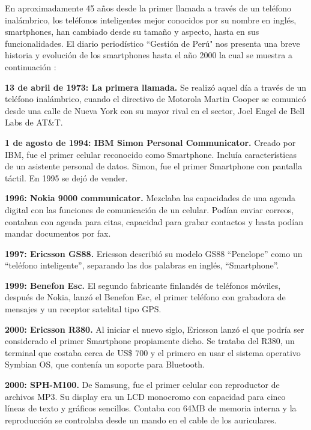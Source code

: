 
En aproximadamente 45 años desde la primer llamada a través de un teléfono inalámbrico, los teléfonos inteligentes mejor conocidos por su nombre en inglés, smartphones, han cambiado desde su tamaño y aspecto, hasta en sus funcionalidades. El diario periodístico ``Gestión de Perú" nos presenta una breve historia y evolución de los smartphones hasta el año 2000 la cual se muestra a continuación  \cite{MBHistoria}: \\ \par

\textbf{13 de abril de 1973: La primera llamada.}
Se realizó aquel día a través de un teléfono inalámbrico, cuando el directivo de Motorola Martin Cooper se comunicó desde una calle de Nueva York con su mayor rival en el sector, Joel Engel de Bell Labs de AT\&T.
\\ \par
\textbf{1 de agosto de 1994: IBM Simon Personal Communicator.}
Creado por IBM, fue el primer celular reconocido como Smartphone. Incluía características de un asistente personal de datos. Simon, fue el primer Smartphone con pantalla táctil. En 1995 se dejó de vender.
\\ \par
\textbf{1996: Nokia 9000 communicator.}
Mezclaba las capacidades de una agenda digital con las funciones de comunicación de un celular. Podían enviar correos, contaban con agenda para citas, capacidad para grabar contactos y hasta podían mandar documentos por fax.
\\ \par
\textbf{1997: Ericsson GS88.}
Ericsson describió su modelo GS88 “Penelope” como un “teléfono inteligente”, separando las dos palabras en inglés, “Smartphone”.
\\ \par
\textbf{1999: Benefon Esc.}
El segundo fabricante finlandés de teléfonos móviles, después de Nokia, lanzó el Benefon Esc, el primer teléfono con grabadora de mensajes y un receptor satelital tipo GPS.
\\ \par
\textbf{2000: Ericsson R380.}
Al iniciar el nuevo siglo, Ericsson lanzó el que podría ser considerado el primer Smartphone propiamente dicho. Se trataba del R380, un terminal que costaba cerca de US\$ 700 y el primero en usar el sistema operativo Symbian OS, que contenía un soporte para Bluetooth.
\\ \par
\textbf{2000: SPH-M100.}
De Samsung, fue el primer celular con reproductor de archivos MP3. Su display era un LCD monocromo con capacidad para cinco líneas de texto y gráficos sencillos. Contaba con 64MB de memoria interna y la reproducción se controlaba desde un mando en el cable de los auriculares.
